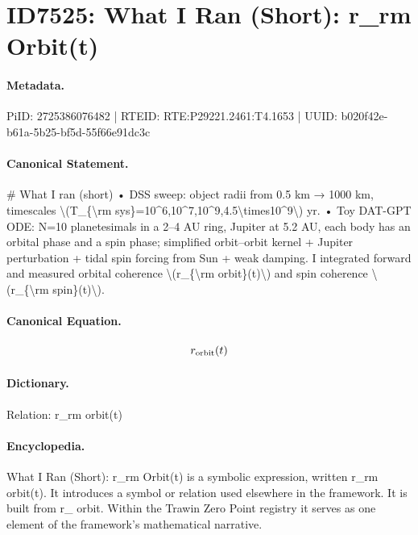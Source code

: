 \section*{ID7525: What I Ran (Short): r\_rm Orbit(t)}
\paragraph{Metadata.}
PiID: 2725386076482 | RTEID: RTE:P29221.2461:T4.1653 | UUID: b020f42e-b61a-5b25-bf5d-55f66e91dc3c

\paragraph{Canonical Statement.}
\# What I ran (short) • DSS sweep: object radii from 0.5 km → 1000 km, timescales \textbackslash{}(T\_\{\textbackslash{}rm sys\}=10\textasciicircum{}6,10\textasciicircum{}7,10\textasciicircum{}9,4.5\textbackslash{}times10\textasciicircum{}9\textbackslash{}) yr. • Toy DAT-GPT ODE: N=10 planetesimals in a 2–4 AU ring, Jupiter at 5.2 AU, each body has an orbital phase and a spin phase; simplified orbit–orbit kernel + Jupiter perturbation + tidal spin forcing from Sun + weak damping. I integrated forward and measured orbital coherence \textbackslash{}(r\_\{\textbackslash{}rm orbit\}(t)\textbackslash{}) and spin coherence \textbackslash{}(r\_\{\textbackslash{}rm spin\}(t)\textbackslash{}).

\paragraph{Canonical Equation.}
\[
r_{\rm orbit}(t)
\]

\paragraph{Dictionary.}
Relation: r\_rm orbit(t)

\paragraph{Encyclopedia.}
What I Ran (Short): r\_rm Orbit(t) is a symbolic expression, written r\_rm orbit(t). It introduces a symbol or relation used elsewhere in the framework. It is built from r\_ orbit. Within the Trawin Zero Point registry it serves as one element of the framework's mathematical narrative.
